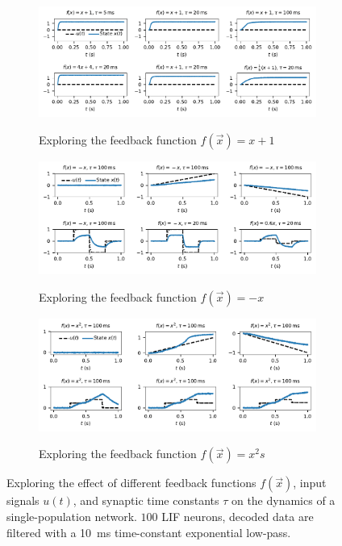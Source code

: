\documentclass[10pt,letterpaper,oneside]{article}
\begin{document}
\begin{figure}
	\centering
	\begin{subfigure}{\textwidth}
		\centering
		\includegraphics{media/fxp1_example_small.pdf}\\[-0.25cm]
		\caption{Exploring the feedback function $f(\vec x) = x + 1$}
		\label{fig:dynamics_example_a}\vspace{0.25cm}
	\end{subfigure}
	\begin{subfigure}{\textwidth}
		\centering
		\includegraphics{media/fmx_example_small.pdf}\\[-0.25cm]
		\caption{Exploring the feedback function $f(\vec x) = -x$}
		\label{fig:dynamics_example_b}\vspace{0.25cm}
	\end{subfigure}
	\begin{subfigure}{\textwidth}
		\centering
		\includegraphics{media/fxs_example_small.pdf}\\[-0.25cm]
		\caption{Exploring the feedback function $f(\vec x) = x^2s$}
		\label{fig:dynamics_example_c}\vspace{0.25cm}
	\end{subfigure}
	\caption{Exploring the effect of different feedback functions $f(\vec x)$, input signals $u(t)$, and synaptic time constants $\tau$ on the dynamics of a single-population network. $100$ LIF neurons, decoded data are filtered with a \SI{10}{\milli\second} time-constant exponential low-pass.  }
	\label{fig:dynamics_example}
\end{figure}
\end{document}
